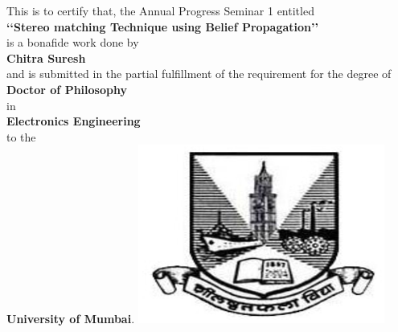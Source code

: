\begin{center}
\large This is to certify that, the Annual Progress Seminar 1 entitled
\vspace{0.15in}\\\textbf {\lq\lq Stereo matching Technique using Belief Propagation\rq\rq} \\
\vspace{0.1in}is a bonafide work done by\vspace{0.15in}
\\\textbf { Chitra Suresh } \\
and is submitted in the partial fulfillment of
the requirement for the degree of \vspace{0.15in} \\\textbf{Doctor  of Philosophy}\\
in \\\textbf{Electronics  Engineering} \\to the \\\textbf{University of Mumbai}.
\includegraphics{university.eps}\\

\vspace{0.2in}
%
%
%
\begin{tabular}{ccc}


\end{tabular}
\end{center}
